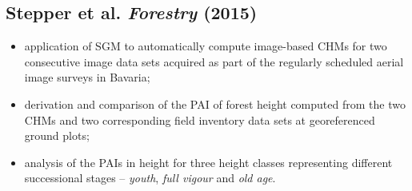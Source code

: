 \subsection*{Stepper et al. \emph{Forestry} (2015)}

\begin{itemize}
	\item application of \ac{SGM} to automatically compute image-based \acp{CHM} for two consecutive image data sets
		acquired as part of the regularly scheduled aerial image surveys in Bavaria;
	
	\item derivation and comparison of the \ac{PAI} of forest height computed from the two \acp{CHM} and
		two corresponding field inventory data sets at georeferenced ground plots;
	
	\item analysis of the \acp{PAI} in height for three height classes representing different successional stages -- \emph{youth}, \emph{full vigour} and \emph{old age}.
\end{itemize}









